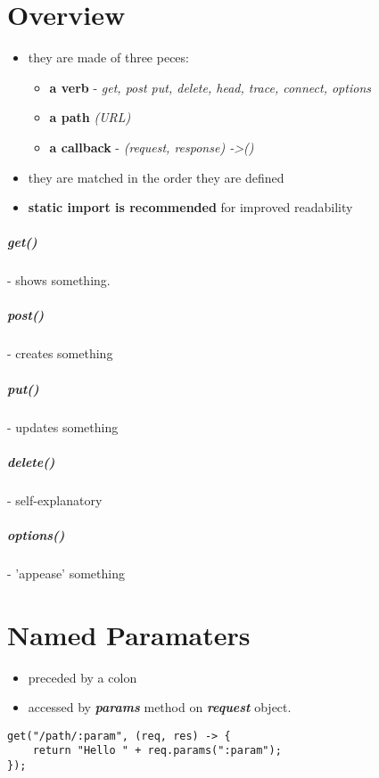 \documentclass{report}
\begin{document}
\chapter{Overview}
\begin{itemize}
	\item they are made of three peces:
	\begin{itemize}
		\item \textbf{a verb} - \textit{get, post put, delete, head, trace, connect, options}
		\item \textbf{a path} \textit{(URL)}
		\item \textbf{a callback} - \textit{(request, response) -\textgreater ()}
	\end{itemize}
	\item they are matched in the order they are defined
	\item \textbf{static import is recommended} for improved readability
\end{itemize}


\paragraph{get()} - shows something.
\paragraph{post()} - creates something
\paragraph{put()} - updates something
\paragraph{delete()} - self-explanatory
\paragraph{options()} - 'appease' something



\chapter{Named Paramaters}
\begin{itemize}
	\item preceded by a colon
	\item accessed by \textbf{\textit{params}} method on \textbf{\textit{request}} object. 
\end{itemize}
\begin{verbatim}
get("/path/:param", (req, res) -> {
    return "Hello " + req.params(":param");
});
\end{verbatim}
\end{document}
